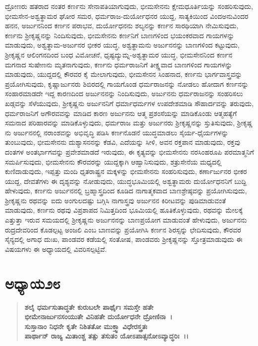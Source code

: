 ದ್ರೋಣರು ಹತರಾದ ನಂತರ ಕಣ೯ನು ಸೇನಾಪತಿಯಾಗುವುದು, ಭೀಮಸೇನನು ಕ್ಷೇಮಧೂರ್ತಿಯನ್ನು ಸಂಹರಿಸುವುದು, ಭೀಮಸೇನ-ಅಶ್ವತ್ಥಾಮರ ಘೋರ ಸಮರ, ಧರ್ಮರಾಜ-ದುರ್ಯೋಧನರ ಯುದ್ದ, ಸಾತ್ಯಕಿಯಿಂದ ವಿಂದಅನುವಿಂದರ ಹನನ, ಅರ್ಜುನನಿಂದ ಕರ್ಣನ ಪರಾಭವ, ದುರ್ಯೋಧನನು ಶಲ್ಯನನ್ನು ಕರ್ಣನ ಸಾರಥಿಯಾಗಿ ನೇಮಿಸುವುದು, ಕರ್ಣನು ಶ‍್ರೀಕೃಷ್ಣನನ್ನು ನಿಂದಿಸುವುದು, ಭೀಮಸೇನನು ಕರ್ಣನಿಗೆ ಬಾಣಗಳಿಂದ ಭಯಂಕರವಾದ ಗಾಯಗಳನ್ನು ಮಾಡುವುದು, ಅಶ್ವತ್ಥಾಮ-ಅರ್ಜುನರ ಭೀಕರ ಯುದ್ಧ, ಅಶ್ವತ್ಥಾಮನು ಅರ್ಜುನನನ್ನು ಬಾಣಗಳಿಂದ ಕಟ್ಟುವುದು, ಶ‍್ರೀಕೃಷ್ಣನ ಆಲಿಂಗನದಿಂದ ಬಂಧ ವಿಮೋಚನೆ, ಧೃಷ್ಟದ್ಯುಮ್ನ-ಅಶ್ವತ್ಥಾಮರ ಯುದ್ಧ, ಭೀಮಸೇನನಿಂದ ಕರ್ಣನ ಮಗನಾದ ಸುಷೇಣನು ಮೃತನಾಗುವುದು, ಕರ್ಣನು ಧರ್ಮರಾಜನಿಗೆ ತೀಕ್ಷ್ಣವಾದ ಬಾಣಗಳಿಂದ ಗಾಯಗಳನ್ನು ಮಾಡುವುದು, ಯುದ್ದದಲ್ಲಿ ಕೌರವರ ಕೈ ಮೇಲಾಗುವುದು, ಭೀಮಸೇನನ ಸಿಂಹನಾದ, ಕರ್ಣನು ಭಾರ್ಗವಾಸ್ತ್ರವನ್ನು ಪ್ರಯೋಗಿಸುವುದು, ಕೃಷ್ಣಾರ್ಜುನರು ಶಿಬಿರದಲ್ಲಿ ಗಾಯಗೊಂಡ ಧರ್ಮರಾಜನನ್ನು ನೋಡಲು ಹೋದಾಗ ಕರ್ಣನನ್ನು ಸಂಹಾರಮಾಡದೇ ಇದ್ದ ಕಾರಣದಿಂದ ಅರ್ಜುನನನ್ನು ನಿಂದಿಸುವುದು, ಅರ್ಜುನನು ಧರ್ಮರಾಜನನ್ನು ಸಂಹರಿಸಲು ಖಡ್ಗವನ್ನು ಸೆಳೆಯುವುದು, ಶ‍್ರೀಕೃಷ್ಣನು ಅರ್ಜುನನಿಗೆ ಧರ್ಮಾಧರ್ಮಗಳ ಉಪದೇಶಮಾಡಿ ಸೌಹಾರ್ದವನ್ನು ತರುವುದು, ಧರ್ಮರಾಜನಿಗೆ ಅಗೌರವವನ್ನು ಮಾಡಿದ ಕಾರಣ ಅರ್ಜುನನು ಆತ್ಮ ಪ್ರಶಂಸೆಯನ್ನು ಮಾಡಿಕೊಂಡು ಆತ್ಮಹತ್ಯೆಗೆ ಸಮನಾದ ಪರಿಹಾರವನ್ನು ಮಾಡಿಕೊಳ್ಳುವುದು, ಧರ್ಮರಾಜ ಮತ್ತು ಅರ್ಜುನರು ಶ‍್ರೀಕೃಷ್ಣನನ್ನು ಸ್ತುತಿಸುವುದು, ಶ‍್ರೀಕೃಷ್ಣ ನು ಅರ್ಜುನನಲ್ಲಿ ನರಾಂಶವನ್ನು ಅಭಿವೃದ್ಧಿ ಪಡಿಸಿ ಕರ್ಣನೊಡನೆ ಯುದ್ಧಮಾಡಲು ಸೈರ್ಯ-ಧೈರ್ಯಗಳನ್ನು ತುಂಬುವುದು, ಭೀಮಸೇನನು ದುಶ್ಯಾಸನನನ್ನು ಕೆಡವಿ, ಎದೆಯನ್ನು ಸೀಳಿ, ಅವನ ರಕ್ತಪಾನ ಮಾಡುವುದು, ರಕ್ತವು ದಂತಗಳ ಅಂತರ್ಭಾಗವನ್ನು ಪ್ರವೇಶಮಾಡದೆ ಇರುವುದು, ಈ ಕೃತ್ಯವನ್ನು ಭೀಮಸೇನನು ನರಸಿಂಹರೂಪಿ ಪರಮಾತ್ಮನಿಗೆ ಸಮರ್ಪಿಸುವುದು, ಭೀಮಸೇನನು ಕೌರವರನ್ನು ಯುದ್ದಕ್ಕಾಗಿ ಆಹ್ವಾನಿಸುವುದು, ಶತ್ರುಸೇನೆಯ ಮಧ್ಯದಲ್ಲಿ ಕುಣಿದಾಡುವುದು, ಇಪ್ಪತ್ತು ಮಂದಿ ಧೃತರಾಷ್ಟ್ರನ ಮಕ್ಕಳನ್ನು ಭೀಮಸೇನನು ಸಂಹರಿಸುವುದು, ಕರ್ಣಾರ್ಜುನರ ಭೀಕರ ಯುದ್ದ, ದೇವತೆಗಳು ಈ ದೃಶ್ಯವನ್ನು ನೋಡುವುದು, ಯುದ್ಧಭೂಮಿಯಲ್ಲಿ ಅಶ್ವತ್ಥಾಮರು ದುರ್ಯೋಧನನಿಗೆ ಬುದ್ದಿ ಹೇಳುವುದು, ಕರ್ಣನು ಅರ್ಜುನನಲ್ಲಿ ಬ್ರಹ್ಮಾಸ್ತ್ರದಿಂದ ಕೂಡಿದ ನಾಗಾತ್ಮಕವಾದ ಬಾಣಶ್ರೇಷ್ಠವನ್ನು ಪ್ರಯೋಗಿಸುವುದು, ಶ‍್ರೀಕೃಷ್ಣನು ರಥವನ್ನು ಐದು ಅಂಗುಲದಷ್ಟು ಬಗ್ಗಿಸಿ ನಾಗಾಸ್ತ್ರವು ಅರ್ಜುನನ ಕಿರೀಟವನ್ನು ಪುಡಿಮಾಡುವಂತೆ ಮಾಡುವುದು, ಕರ್ಣನು ರಥವು ವಿಪ್ರಶಾಪದ ನಿಮಿತ್ತದಿಂದ ಭೂಮಿಯಲ್ಲಿ ಹೂತಿಕೊಳ್ಳುವುದು, ರಥವನ್ನು ಮೇಲಕ್ಕೆ ಎತ್ತುತ್ತಾ ಇರುವ ಸಮಯದಲ್ಲಿ ಶ‍್ರೀಕೃಷ್ಣನು ಅರ್ಜುನನನ್ನು ಬಾಣಪ್ರಯೋಗ ಮಾಡುವಂತೆ ಹೇಳುವುದು, ಅರ್ಜುನನು ರುದ್ರದೇವರಿಂದ ಕೊಡಲ್ಪಟ್ಟ ಅಂಜಲಿ ಎಂಬ ಬಾಣವನ್ನು ಪ್ರಯೋಗಿಸಿ ಕರ್ಣನ ಶಿರಸ್ಸನ್ನು ಛೇದಿಸುವುದು, ಕೌರವರ ಸೈನ್ಯದಲ್ಲಿ ಅಗಾಧ ದುಃಖ, ಪಾಂಡವರ ಕಡೆಯಲ್ಲಿ ಸಂತೋಷ, ಪಾಂಡವರು ಶ‍್ರೀಕೃಷ್ಣನನ್ನು ಸ್ತೋತ್ರಮಾಡುವುದು ಈ ವಿಷಯಗಳು ಈ ಅಧ್ಯಾಯದಲ್ಲಿ ವಿವರಿಸಲ್ಪಟ್ಟಿವೆ.


\section*{ಅಧ್ಯಾಯ\enginline{-}೨೮}

\begin{verse}
\textbf{ಶಲೈ ಧರ್ಮಸುತಾದ್ಧತೇ ಕುರುಬಲೇ ಪಾರ್ಥೈಃ ಸಮಸ್ತೇ ಹತೇ}\\\textbf{ಭೀಮೇನಾರ್ಜುನಸಂಯುತೇ ವಿನಿಹತೇ ದುರ್ಯೋಧನೇ ದ್ರೋಣಿನಾ~।}\\\textbf{ಸುಸ್ತಾನಾಂ ನಿಧನೇ ಕೃತೇ ನಿಶಿತತೋ ಮುಕ್ತ್ವಾ ವಿಧೇರಸ್ತ್ರತಃ}\\\textbf{ಪಾರ್ಥಾನ್ ರಾಜ್ಯ ಮಿತಾಂಶ್ಚ ತತ್ಸು ತಸುತಂ ಯೋಽಪಾತ್ಸನೋಽವ್ಯಾದ್ಧರಿಃ~।।}
\end{verse}

